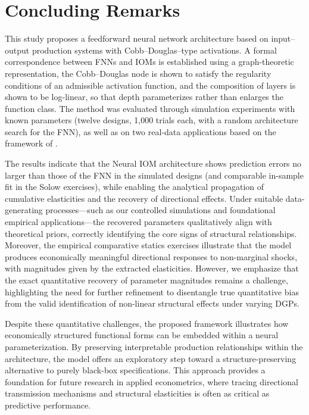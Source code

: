 \documentclass[preprint,12pt,authoryear]{sn-jnl}
\begin{document}
\section{Concluding Remarks}

This study proposes a feedforward neural network architecture based on input–output production systems with Cobb–Douglas–type activations. A formal correspondence between FNNs and IOMs is established using a graph-theoretic representation, the Cobb–Douglas node is shown to satisfy the regularity conditions of an admissible activation function, and the composition of layers is shown to be log-linear, so that depth parameterizes rather than enlarges the function class. The method was evaluated through simulation experiments with known parameters (twelve designs, 1,000 trials each, with a random architecture search for the FNN), as well as on two real-data applications based on the framework of \cite{mankiw1992contribution}. 

The results indicate that the Neural IOM architecture shows prediction errors no larger than those of the FNN in the simulated designs (and comparable in-sample fit in the Solow exercises), while enabling the analytical propagation of cumulative elasticities and the recovery of directional effects. Under suitable data-generating processes—such as our controlled simulations and foundational empirical applications—the recovered parameters qualitatively align with theoretical priors, correctly identifying the core signs of structural relationships.  Moreover, the empirical comparative statics exercises illustrate that the model produces economically meaningful directional responses to non-marginal shocks, with magnitudes given by the extracted elasticities. However, we emphasize that the exact quantitative recovery of parameter magnitudes remains a challenge, highlighting the need for further refinement to disentangle true quantitative bias from the valid identification of non-linear structural effects under varying DGPs.

Despite these quantitative challenges, the proposed framework illustrates how economically structured functional forms can be embedded within a neural parameterization. By preserving interpretable production relationships within the architecture, the model offers an exploratory step toward a structure-preserving alternative to purely black-box specifications. This approach provides a foundation for future research in applied econometrics, where tracing directional transmission mechanisms and structural elasticities is often as critical as predictive performance.
\end{document}
